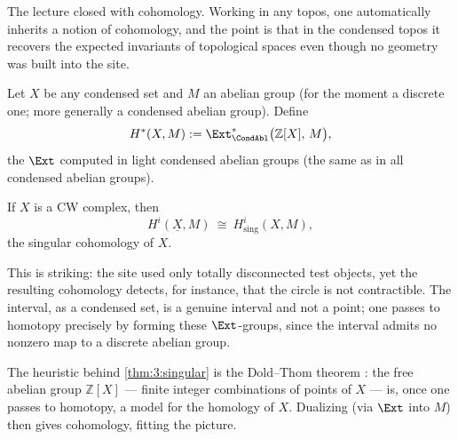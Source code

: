 The lecture closed with cohomology. Working in any topos, one automatically
inherits a notion of cohomology, and the point is that in the condensed topos it
recovers the expected invariants of topological spaces even though no geometry
was built into the site.

\begin{definition}
\label{def:3:cohomology}
Let $X$ be any condensed set and $M$ an abelian group (for the moment a discrete
one; more generally a condensed abelian group). Define
\begin{equation*}
H^{*}(X,M):=\Ext^{*}_{\CondAbl}\bigl(\mathbb{Z}[X],\,M\bigr),
\end{equation*}
the $\Ext$ computed in light condensed abelian groups (the same as in all
condensed abelian groups).
\end{definition}

\begin{theorem}
\label{thm:3:singular}
If $X$ is a CW complex, then
\begin{equation*}
H^{i}(\underline{X},M)\ \cong\ H^{i}_{\mathrm{sing}}(X,M),
\end{equation*}
the singular cohomology of $X$.
\end{theorem}

\begin{remark}
\label{rmk:3:geometry-out-of-nothing}
This is striking: the site used only totally disconnected test objects, yet the
resulting cohomology detects, for instance, that the circle is not contractible.
The interval, as a condensed set, is a genuine interval and not a point; one
passes to homotopy precisely by forming these $\Ext$-groups, since the interval
admits no nonzero map to a discrete abelian group.
\end{remark}

\begin{remark}
\label{rmk:3:dold-thom}
The heuristic behind \cref{thm:3:singular} is the Dold--Thom theorem
\cite{Dold_1958}: the free abelian group $\mathbb{Z}[X]$ --- finite integer
combinations of points of $X$ --- is, once one passes to homotopy, a model for
the homology of $X$. Dualizing (via $\Ext$ into $M$) then gives cohomology,
fitting the picture.
\end{remark}

